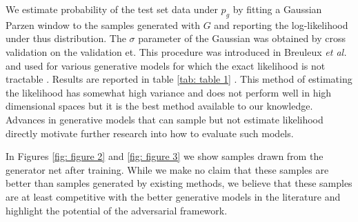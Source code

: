We estimate probability of the test set data under $p_g$ by fitting a Gaussian Parzen window to the samples generated with $G$ and reporting the log-likelihood under thus distribution. The $\sigma$ parameter of the Gaussian was obtained by cross validation on the validation et. This procedure was introduced in Breuleux \emph{et al.} \cite{8_6796083} and used for various generative models for which the exact likelihood is not tractable \cite{25_10.5555/3042573.3042804,3_pmlr-v28-bengio13,5_bengio2014deepgenerativestochasticnetworks}. Results are reported in table \ref{tab: table 1}
. This method of estimating the likelihood has somewhat high variance and does not perform well in high dimensional spaces but it is the best method available to our knowledge. Advances in generative models that can sample but not estimate likelihood directly motivate further research into how to evaluate such models.

In Figures \ref{fig: figure 2} and \ref{fig: figure 3} we show samples drawn from the generator net after training. While we make no claim that these samples are better than samples generated by existing methods, we believe that these samples are at least competitive with the better generative models in the literature and highlight the potential of the adversarial framework.

